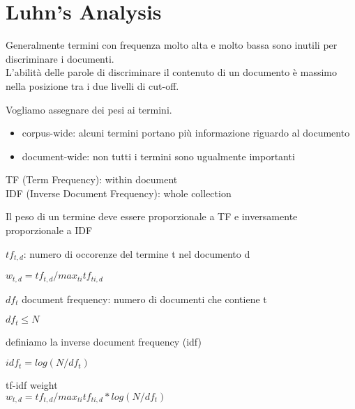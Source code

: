 \section{Luhn's Analysis}
Generalmente termini con frequenza molto alta e molto bassa sono inutili per discriminare i documenti.
\\


L'abilità delle parole di discriminare il contenuto di un documento è massimo nella posizione tra i due livelli di cut-off.


Vogliamo assegnare dei pesi ai termini.
\begin{itemize}
  \item corpus-wide: alcuni termini portano più informazione riguardo al documento
  \item document-wide: non tutti i termini sono ugualmente importanti
\end{itemize}

TF (Term Frequency): within document\\
IDF (Inverse Document Frequency): whole collection

Il peso di un termine deve essere proporzionale a TF e inversamente proporzionale a IDF

$tf_{t,d}$: numero di occorenze del termine t nel documento d

$w_{t, d} = tf_{t,d} / max_{ti} tf_{ti,d}$

$df_t$ document frequency: numero di documenti che contiene t

$df_t \leq N$

definiamo la inverse document frequency (idf)

$idf_t = log(N/df_t)$

tf-idf weight\\
$w_{t, d} = tf_{t,d} / max_{ti} tf_{ti,d} * log(N/df_t)$
